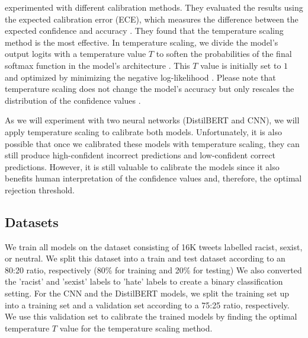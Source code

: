 %
\citet{guo2017calibration} experimented with different calibration methods.
%
They evaluated the results using the expected calibration error (ECE), which measures the difference between the expected confidence and accuracy \citep{guo2017calibration}.
%
They found that the temperature scaling method is the most effective.
%
In temperature scaling, we divide the model's output logits with a temperature value $T$ to soften the probabilities of the final softmax function in the model's architecture \citep{guo2017calibration}.
%
This $T$ value is initially set to $1$ and optimized by minimizing the negative log-likelihood \citep{guo2017calibration}.
%
Please note that temperature scaling does not change the model's accuracy but only rescales the distribution of the confidence values \citep{guo2017calibration}.
%

%
As we will experiment with two neural networks (DistilBERT and CNN), we will apply temperature scaling to calibrate both models.
%
Unfortunately, it is also possible that once we calibrated these models with temperature scaling, they can still produce high-confident incorrect predictions and low-confident correct predictions.
%
However, it is still valuable to calibrate the models since it also benefits human interpretation of the confidence values and, therefore, the optimal rejection threshold.
%

\subsection{Datasets}
We train all models on the \citet{waseem2016hateful} dataset consisting of 16K tweets labelled racist, sexist, or neutral.
%
We split this dataset into a train and test dataset according to an 80:20 ratio, respectively (80\% for training and 20\% for testing)
%
We also converted the 'racist' and 'sexist' labels to 'hate' labels to create a binary classification setting.
%
For the CNN and the DistilBERT models, we split the training set up into a training set and a validation set according to a 75:25 ratio, respectively.
%
We use this validation set to calibrate the trained models by finding the optimal temperature $T$ value for the temperature scaling method.
%

